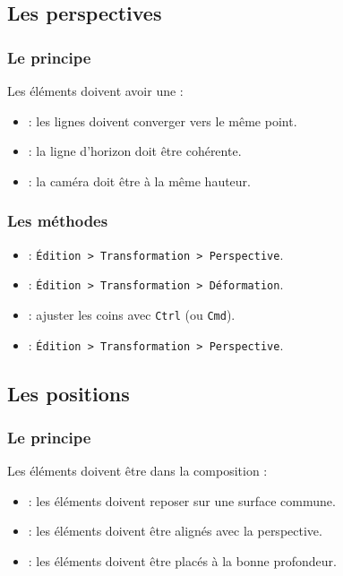 \subsection{Les perspectives}

\subsubsection{Le principe}

Les éléments doivent avoir une  :

\begin{itemize}
    \item {} : les lignes doivent converger vers le même point.
    \item {} : la ligne d'horizon doit être cohérente.
    \item {} : la caméra doit être à la même hauteur.
\end{itemize}

\subsubsection{Les méthodes}

\begin{itemize}
    \item {} : \texttt{Édition > Transformation > Perspective}.
    \item {} : \texttt{Édition > Transformation > Déformation}.
    \item {} : ajuster les coins avec \texttt{Ctrl} (ou \texttt{Cmd}).
    \item {} : \texttt{Édition > Transformation > Perspective}.
\end{itemize}

\subsection{Les positions}

\subsubsection{Le principe}

Les éléments doivent être  dans la composition :

\begin{itemize}
    \item {} : les éléments doivent reposer sur une surface commune.
    \item {} : les éléments doivent être alignés avec la perspective.
    \item {} : les éléments doivent être placés à la bonne profondeur.
\end{itemize}

